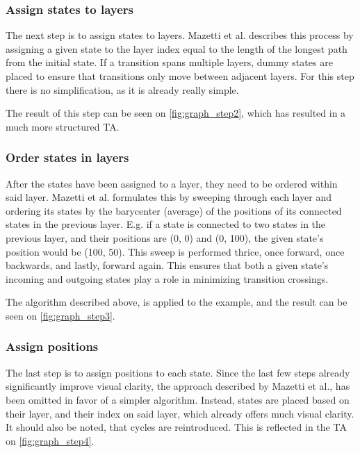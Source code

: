 \begin{center}
    
\end{center}

\subsubsection{Assign states to layers}
The next step is to assign states to layers. Mazetti et al. describes this process by assigning a given state to the layer index equal to the length of the longest path from the initial state. If a transition spans multiple layers, dummy states are placed to ensure that transitions only move between adjacent layers.  For this step there is no simplification, as it is already really simple. \cite{Mazetti2012}

The result of this step can be seen on \cref{fig:graph_step2}, which has resulted in a much more structured TA.

\begin{center}
    
\end{center}

\subsubsection{Order states in layers}
After the states have been assigned to a layer, they need to be ordered within said layer.
Mazetti et al. formulates this by sweeping through each layer and ordering its states by the barycenter (average) of the positions of its connected states in the previous layer.
E.g. if a state is connected to two states in the previous layer, and their positions are (0, 0) and (0, 100), the given state's position would be (100, 50).
This sweep is performed thrice, once forward, once backwards, and lastly, forward again.
This ensures that both a given state's incoming and outgoing states play a role in minimizing transition crossings. \cite{Mazetti2012}

The algorithm described above, is applied to the example, and the result can be seen on \cref{fig:graph_step3}.
\begin{center}
    
\end{center}

\subsubsection{Assign positions}
The last step is to assign positions to each state.
Since the last few steps already significantly improve visual clarity, the approach described by Mazetti et al., has been omitted in favor of a simpler algorithm. Instead, states are placed based on their layer, and their index on said layer, which already offers much visual clarity. It should also be noted, that cycles are reintroduced. This is reflected in the TA on \cref{fig:graph_step4}.

\begin{center}
    
\end{center}
